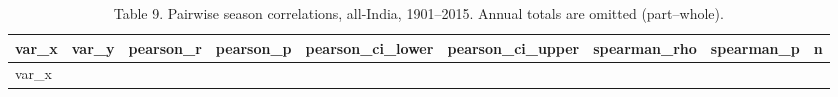 \documentclass[
]{article}
\begin{document}
\begin{longtable}[]{@{}
  >{\raggedright\arraybackslash}p{}
  >{\raggedright\arraybackslash}p{}
  >{\raggedleft\arraybackslash}p{}
  >{\raggedleft\arraybackslash}p{}
  >{\raggedleft\arraybackslash}p{}
  >{\raggedleft\arraybackslash}p{}
  >{\raggedleft\arraybackslash}p{}
  >{\raggedleft\arraybackslash}p{}
  >{\raggedleft\arraybackslash}p{}@{}}
\caption{Table 9. Pairwise season correlations, all-India, 1901--2015.
Annual totals are omitted (part--whole).}\tabularnewline
\toprule\noalign{}
\begin{minipage}[b]{\linewidth}\raggedright
var\_x
\end{minipage} & \begin{minipage}[b]{\linewidth}\raggedright
var\_y
\end{minipage} & \begin{minipage}[b]{\linewidth}\raggedleft
pearson\_r
\end{minipage} & \begin{minipage}[b]{\linewidth}\raggedleft
pearson\_p
\end{minipage} & \begin{minipage}[b]{\linewidth}\raggedleft
pearson\_ci\_lower
\end{minipage} & \begin{minipage}[b]{\linewidth}\raggedleft
pearson\_ci\_upper
\end{minipage} & \begin{minipage}[b]{\linewidth}\raggedleft
spearman\_rho
\end{minipage} & \begin{minipage}[b]{\linewidth}\raggedleft
spearman\_p
\end{minipage} & \begin{minipage}[b]{\linewidth}\raggedleft
n
\end{minipage} \\
\midrule\noalign{}
\endfirsthead
\toprule\noalign{}
\begin{minipage}[b]{\linewidth}\raggedright
var\_x
\end{minipage} & \begin{minipage}[b]{\linewidth}\raggedright

\end{minipage}
\end{longtable}
\end{document}
